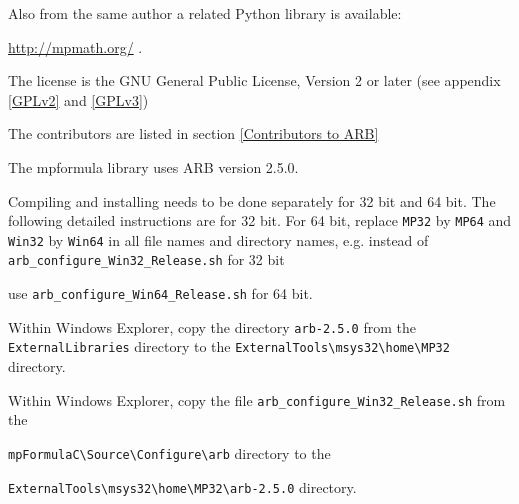 \vpara
Also from the same author a related Python library is available:

\href{http://mpmath.org/}{http://mpmath.org/} . 


\vpara
The license is the GNU General Public License, Version 2 or later (see appendix \ref{GPLv2} and \ref{GPLv3})

The contributors are listed in section \ref{Contributors to ARB}

The mpformula library uses ARB version 2.5.0.



\vpara
Compiling and installing needs to be done separately for 32 bit and 64 bit. The following detailed instructions are for 32 bit. For 64 bit, replace \verb|MP32| by \verb|MP64| and \verb|Win32| by  \verb|Win64| in all file names and directory names, e.g. instead of \verb|arb_configure_Win32_Release.sh| for 32 bit

use \verb|arb_configure_Win64_Release.sh| for 64 bit.

\vpara
Within Windows Explorer, copy the directory \verb|arb-2.5.0|  from the \verb|ExternalLibraries|
directory to the \verb|ExternalTools\msys32\home\MP32| directory. 

\vpara
Within Windows Explorer, copy the file \verb|arb_configure_Win32_Release.sh|  from the

\verb|mpFormulaC\Source\Configure\arb| directory to the 

\verb|ExternalTools\msys32\home\MP32\arb-2.5.0| directory.  


